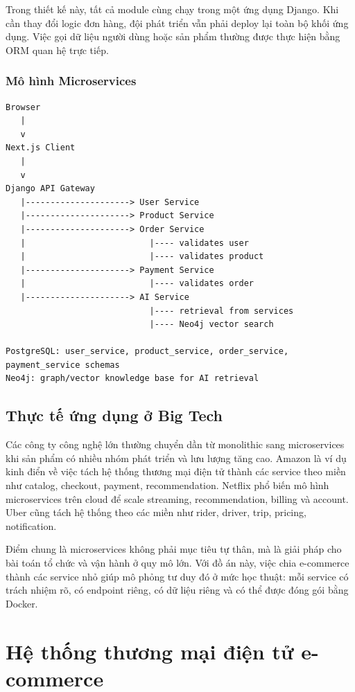 \documentclass[12pt,a4paper]{report}
\begin{document}
Trong thiết kế này, tất cả module cùng chạy trong một ứng dụng Django. Khi cần thay đổi logic đơn hàng, đội phát triển vẫn phải deploy lại toàn bộ khối ứng dụng. Việc gọi dữ liệu người dùng hoặc sản phẩm thường được thực hiện bằng ORM quan hệ trực tiếp.

\subsection{Mô hình Microservices}
\begin{lstlisting}[style=code,caption={Thiết kế Microservices trong dự án e-commerce}]
Browser
   |
   v
Next.js Client
   |
   v
Django API Gateway
   |---------------------> User Service
   |---------------------> Product Service
   |---------------------> Order Service
   |                         |---- validates user
   |                         |---- validates product
   |---------------------> Payment Service
   |                         |---- validates order
   |---------------------> AI Service
                             |---- retrieval from services
                             |---- Neo4j vector search

PostgreSQL: user_service, product_service, order_service, payment_service schemas
Neo4j: graph/vector knowledge base for AI retrieval
\end{lstlisting}

\section{Thực tế ứng dụng ở Big Tech}
Các công ty công nghệ lớn thường chuyển dần từ monolithic sang microservices khi sản phẩm có nhiều nhóm phát triển và lưu lượng tăng cao. Amazon là ví dụ kinh điển về việc tách hệ thống thương mại điện tử thành các service theo miền như catalog, checkout, payment, recommendation. Netflix phổ biến mô hình microservices trên cloud để scale streaming, recommendation, billing và account. Uber cũng tách hệ thống theo các miền như rider, driver, trip, pricing, notification.

Điểm chung là microservices không phải mục tiêu tự thân, mà là giải pháp cho bài toán tổ chức và vận hành ở quy mô lớn. Với đồ án này, việc chia e-commerce thành các service nhỏ giúp mô phỏng tư duy đó ở mức học thuật: mỗi service có trách nhiệm rõ, có endpoint riêng, có dữ liệu riêng và có thể được đóng gói bằng Docker.

\chapter{Hệ thống thương mại điện tử e-commerce}
\end{document}
